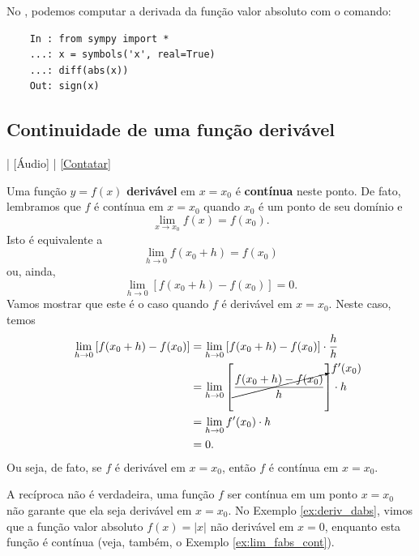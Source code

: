 \begin{ex}
  \ifispython
  No \sympy, podemos computar a derivada da função valor absoluto com o comando:
  \begin{lstlisting}
    In : from sympy import *
    ...: x = symbols('x', real=True)
    ...: diff(abs(x))
    Out: sign(x)
  \end{lstlisting}
  \fi
\end{ex}

\subsection{Continuidade de uma função derivável}

\begin{flushright}
  [Vídeo] | [Áudio] | \href{https://phkonzen.github.io/notas/contato.html}{[Contatar]}
\end{flushright}

Uma função $y=f(x)$ {\bf derivável} em $x=x_0$ é {\bf contínua} neste ponto. De fato, lembramos que $f$ é contínua em $x=x_0$ quando $x_0$ é um ponto de seu domínio e
\begin{equation}
  \lim_{x\to x_0} f(x) = f(x_0).
\end{equation}
Isto é equivalente a
\begin{equation}
  \lim_{h\to 0} f(x_0+h) = f(x_0)
\end{equation}
ou, ainda,
\begin{equation}
  \lim_{h\to 0} \left[f(x_0+h)-f(x_0)\right] = 0.
\end{equation}
Vamos mostrar que este é o caso quando $f$ é derivável em $x=x_0$. Neste caso, temos
\begin{align}
  \lim_{h\to 0} \left[f(x_0+h)-f(x_0)\right] &= \lim_{h\to 0} \left[f(x_0+h)-f(x_0)\right]\cdot \frac{h}{h} \\
                                             &= \lim_{h\to 0} \left[\cancelto{f'(x_0)}{\frac{f(x_0+h)-f(x_0)}{h}}\right]\cdot h \\
                                             &= \lim_{h\to 0} f'(x_0)\cdot h \\
                                             &= 0.
\end{align}
Ou seja, de fato, se $f$ é derivável em $x=x_0$, então $f$ é contínua em $x=x_0$.

\begin{obs}
  A recíproca não é verdadeira, uma função $f$ ser contínua em um ponto $x=x_0$ não garante que ela seja derivável em $x=x_0$. No Exemplo \ref{ex:deriv_dabs}, vimos que a função valor absoluto $f(x) = |x|$ não derivável em $x=0$, enquanto esta função é contínua (veja, também, o Exemplo \ref{ex:lim_fabs_cont}).
\end{obs}

